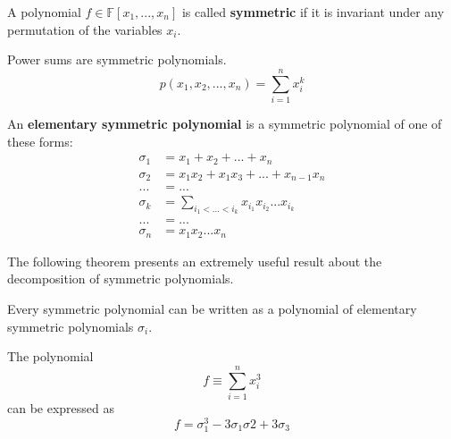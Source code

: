   \begin{definition}
    A polynomial $f \in \mathbb{F}[x_1, ..., x_n]$ is called \textbf{symmetric} if it is invariant under any permutation of the variables $x_i$. 
  \end{definition}

  \begin{example}
    Power sums are symmetric polynomials. 
    \begin{equation}
      p(x_1, x_2, ..., x_n) = \sum_{i=1}^n x_i^k
    \end{equation}
  \end{example}

  \begin{definition}
    An \textbf{elementary symmetric polynomial} is a symmetric polynomial of one of these forms: 
    \begin{align*}
      \sigma_1 & = x_1 + x_2 + ... + x_n \\
      \sigma_2 & = x_1 x_2 + x_1 x_3 + ... + x_{n-1} x_n \\
      ... & = ... \\
      \sigma_k & = \sum_{i_1 < ... < i_k} x_{i_1} x_{i_2} ... x_{i_k} \\
      ... & = ... \\
      \sigma_n & = x_1 x_2 ... x_n
    \end{align*}
  \end{definition}

  The following theorem presents an extremely useful result about the decomposition of symmetric polynomials. 

  \begin{theorem}
    Every symmetric polynomial can be written as a polynomial of elementary symmetric polynomials $\sigma_i$. 
  \end{theorem}

  \begin{example}
    The polynomial 
    \begin{equation}
      f \equiv \sum_{i=1}^n x_i^3
    \end{equation}
    can be expressed as 
    \begin{equation}
      f = \sigma_1^3 - 3 \sigma_1 \sigma 2 + 3 \sigma_3
    \end{equation}
  \end{example}

